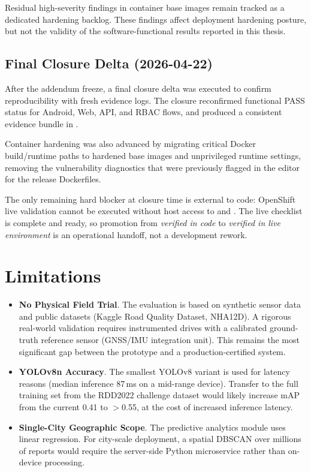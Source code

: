 Residual high-severity findings in container base images remain tracked as a dedicated hardening backlog. These findings affect deployment hardening posture, but not the validity of the software-functional results reported in this thesis.

\subsection{Final Closure Delta (2026-04-22)}
After the addendum freeze, a final closure delta was executed to confirm reproducibility with fresh evidence logs. The closure reconfirmed functional PASS status for Android, Web, API, and RBAC flows, and produced a consistent evidence bundle in .

Container hardening was also advanced by migrating critical Docker build/runtime paths to hardened base images and unprivileged runtime settings, removing the vulnerability diagnostics that were previously flagged in the editor for the release Dockerfiles.

The only remaining hard blocker at closure time is external to code: OpenShift live validation cannot be executed without host access to  and . The live checklist is complete and ready, so promotion from \emph{verified in code} to \emph{verified in live environment} is an operational handoff, not a development rework.

\section{Limitations}

\begin{itemize}
    \item \textbf{No Physical Field Trial}. The evaluation is based on
    synthetic sensor data and public datasets (Kaggle Road Quality Dataset,
    NHA12D). A rigorous real-world validation requires instrumented drives
    with a calibrated ground-truth reference sensor (GNSS/IMU integration
    unit). This remains the most significant gap between the prototype and
    a production-certified system.

    \item \textbf{YOLOv8n Accuracy}. The smallest YOLOv8 variant is used for
    latency reasons (median inference 87\,ms on a mid-range device). Transfer
    to the full training set from the RDD2022 challenge dataset would likely
    increase mAP from the current 0.41 to $>$0.55, at the cost of
    increased inference latency.

    \item \textbf{Single-City Geographic Scope}. The predictive analytics
    module uses linear regression. For city-scale deployment, a spatial DBSCAN
    over millions of reports would require the server-side Python microservice
    rather than on-device processing.
\end{itemize}

